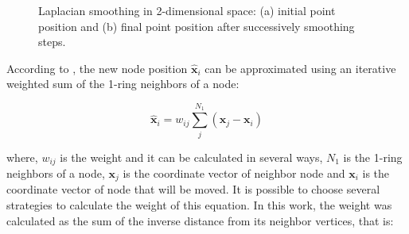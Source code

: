 \begin{figure}[H]
\begin{center}
\end{center}
\caption{Laplacian smoothing in 2-dimensional space: 
(a) initial point position and
(b) final point position after successively smoothing steps.
}
\label{laplacian smoothing space}
\end{figure}




\medskip
According to \cite{zheng1996}, the new node position 
$\hat{\textbf{x}}_{i}$ can be approximated using an 
iterative weighted sum
of the 1-ring neighbors of a node:

\begin{equation} \label{laplacian new position}
\hat{\textbf{x}}_{i} 
= w_{ij} \sum_{j}^{N_1}
\left( \textbf{x}_{j} - \textbf{x}_{i} \right)
\end{equation}

\medskip
\noindent
where, 
$w_{ij}$ is the weight and it can be calculated in several ways,
$N_{1}$ is the 1-ring neighbors of a node,
$\textbf{x}_{j}$ is the coordinate vector of neighbor node and
$\textbf{x}_{i}$ is the coordinate vector of node that will be moved.
It is possible to choose several strategies to calculate 
the weight of this equation. In this work, the weight was 
calculated as the sum of the inverse distance from its neighbor vertices,
that is:

